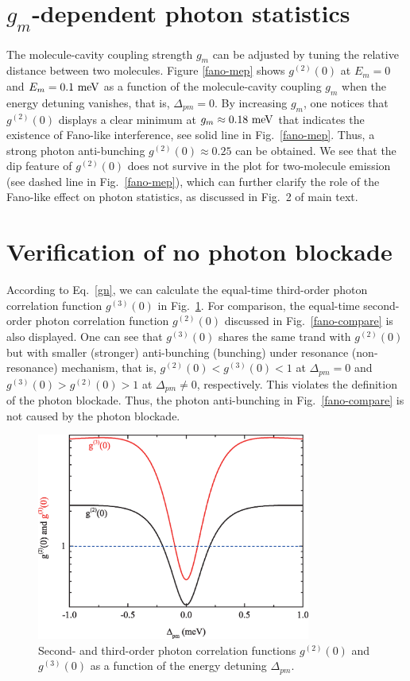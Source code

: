 \documentclass[aps,prb,
superscriptaddress,
,floatfix,footinbib,longbibliography,
preprint
]{revtex4-2}
\begin{document}
\section{$g_{m}$-dependent photon statistics}
\label{gm-photon}
The molecule-cavity coupling strength $g_{m}$ can be adjusted by tuning the relative distance between two molecules.
 Figure \ref{fano-mep} shows $g^{(2)}(0)$ at
$E_{m}=0$ and $E_{m}=0.1~{\rm meV}$ as a function of the molecule-cavity coupling $g_{m}$ when the energy detuning vanishes, that is, $\Delta_{pm}=0$.
By increasing $g_{m}$, one notices that $g^{(2)}(0)$ displays a clear minimum at $g_{m}\approx 0.18~{\rm meV}$ that indicates the existence of Fano-like interference, see solid line in Fig.~\ref{fano-mep}.
Thus, a strong photon anti-bunching $g^{(2)}(0)\approx0.25$ can be obtained.
We see that the dip feature of $g^{(2)}(0)$ does not survive in the plot for two-molecule emission (see dashed line in Fig.~\ref{fano-mep}), which can further clarify the role of the Fano-like effect on photon statistics, as discussed in Fig.~2 of main text.


\iffalse
\section{Verification of no photon blockade}
\label{photon blockade}
According to Eq.~\ref{gn}, we can calculate the equal-time third-order photon correlation function $g^{(3)}(0)$ in Fig.~\ref{figure:g3}.
For comparison, the equal-time second-order photon correlation function $g^{(2)}(0)$ discussed in Fig.~\ref{fano-compare} is also displayed.
One can see that $g^{(3)}(0)$ shares the same trand with $g^{(2)}(0)$ but with smaller (stronger) anti-bunching (bunching) under resonance (non-resonance) mechanism,
that is, $g^{(2)}(0)<g^{(3)}(0)<1$ at $\Delta_{pm}=0$ and $g^{(3)}(0)>g^{(2)}(0)>1$ at $\Delta_{pm}\neq0$, respectively.
This violates the definition of the photon blockade\cite{PhysRevA.87.023809,PhysRevA.90.023846}. Thus, the photon anti-bunching in Fig.~\ref{fano-compare} is not caused by the photon blockade.
\begin{figure}
\centering
\includegraphics[width=9cm]{g3.eps}
\caption{Second- and third-order photon correlation functions $g^{(2)}(0)$ and $g^{(3)}(0)$ as a function of the energy detuning $\Delta_{pm}$.}
\label{figure:g3}
\end{figure}
\end{document}
